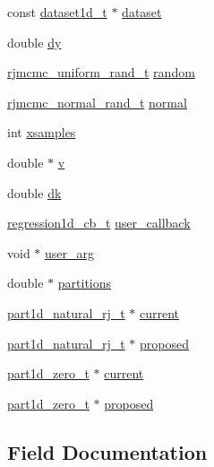 \begin{DoxyCompactItemize}
\item 
const \hyperlink{dataset1d_8h_a232f8372957af83ed6a261e9b89dd8f6}{dataset1d\+\_\+t} $\ast$ \hyperlink{structpart1d_aa3c75da174a531e47a74dd96150a93db}{dataset}
\item 
double \hyperlink{structpart1d_aafa6be49ab86fbb50af3e97da908a491}{dy}
\item 
\hyperlink{rjmcmc__random_8h_accc36e83459ada552d8f70962190dac0}{rjmcmc\+\_\+uniform\+\_\+rand\+\_\+t} \hyperlink{structpart1d_ae01ce5494186491913b6a1cca714753f}{random}
\item 
\hyperlink{rjmcmc__random_8h_a498625755d377b68ad37c9ab360e83b0}{rjmcmc\+\_\+normal\+\_\+rand\+\_\+t} \hyperlink{structpart1d_a729c1fa7fcda6bb018df1c9ab908be7c}{normal}
\item 
int \hyperlink{structpart1d_ae2195f767f3cd44a72bf712445ea1b4c}{xsamples}
\item 
double $\ast$ \hyperlink{structpart1d_a51e5fae9ad993ca788b0d842d3ac5d61}{v}
\item 
double \hyperlink{structpart1d_a6db1dbd38a9eca03cd4e4c8cc94db05d}{dk}
\item 
\hyperlink{regression_8h_ae892a560d7749e7aa48352b053c54a26}{regression1d\+\_\+cb\+\_\+t} \hyperlink{structpart1d_a1d1094b52704266ac86cf45aa9127d68}{user\+\_\+callback}
\item 
void $\ast$ \hyperlink{structpart1d_a68e2266ae8908eddc429ef8ff26b1dbd}{user\+\_\+arg}
\item 
double $\ast$ \hyperlink{structpart1d_a4f6721b3b9fc5faa4dd6c19f30a52ace}{partitions}
\item 
\hyperlink{part1d__natural__rj_8h_a921d1cfb514677f0f6a52c64d96edb5c}{part1d\+\_\+natural\+\_\+rj\+\_\+t} $\ast$ \hyperlink{structpart1d_a52e178e6ba831028417223d0d9f95dd2}{current}
\item 
\hyperlink{part1d__natural__rj_8h_a921d1cfb514677f0f6a52c64d96edb5c}{part1d\+\_\+natural\+\_\+rj\+\_\+t} $\ast$ \hyperlink{structpart1d_aa2cdbab752ff56e0bd1e09b7ce150f04}{proposed}
\item 
\hyperlink{part1d__zero_8h_a03a856fcdfe27544c68d2d1a7cc16dc3}{part1d\+\_\+zero\+\_\+t} $\ast$ \hyperlink{structpart1d_a6f750deb0ee1bbe79c17d1d2459e53c4}{current}
\item 
\hyperlink{part1d__zero_8h_a03a856fcdfe27544c68d2d1a7cc16dc3}{part1d\+\_\+zero\+\_\+t} $\ast$ \hyperlink{structpart1d_a8db6c3fe4b4287d1e485d3f10b63169e}{proposed}
\end{DoxyCompactItemize}


\subsection{Field Documentation}
